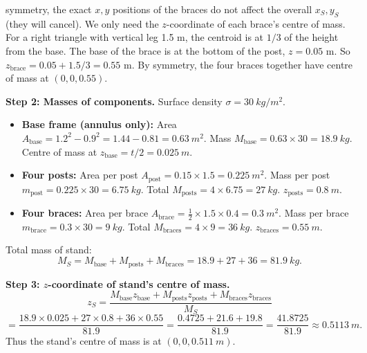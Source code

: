 \documentclass[11pt]{article}
\begin{document}
\begin{exoresolu}
\begin{enumerate}
symmetry, the exact $x,y$ positions of the braces do not affect the overall $x_S,y_S$ (they will cancel). We only need the $z$-coordinate of each brace's centre of mass. For a right triangle with vertical leg 1.5 m, the centroid is at $1/3$ of the height from the base. The base of the brace is at the bottom of the post, $z=0.05$ m. So $z_{\text{brace}} = 0.05 + 1.5/3 = 0.55$ m. By symmetry, the four braces together have centre of mass at $(0,0,0.55)$.
\end{enumerate}

\textbf{Step 2: Masses of components.}
Surface density $\sigma = \SI{30}{kg/m^2}$.
\begin{itemize}
    \item \textbf{Base frame (annulus only):} Area $A_{\text{base}} = 1.2^2 - 0.9^2 = 1.44 - 0.81 = \SI{0.63}{m^2}$. Mass $M_{\text{base}} = 0.63 \times 30 = \SI{18.9}{kg}$. Centre of mass at $z_{\text{base}} = t/2 = \SI{0.025}{m}$.
    \item \textbf{Four posts:} Area per post $A_{\text{post}} = 0.15 \times 1.5 = \SI{0.225}{m^2}$. Mass per post $m_{\text{post}} = 0.225 \times 30 = \SI{6.75}{kg}$. Total $M_{\text{posts}} = 4 \times 6.75 = \SI{27}{kg}$. $z_{\text{posts}} = \SI{0.8}{m}$.
    \item \textbf{Four braces:} Area per brace $A_{\text{brace}} = \frac{1}{2} \times 1.5 \times 0.4 = \SI{0.3}{m^2}$. Mass per brace $m_{\text{brace}} = 0.3 \times 30 = \SI{9}{kg}$. Total $M_{\text{braces}} = 4 \times 9 = \SI{36}{kg}$. $z_{\text{braces}} = \SI{0.55}{m}$.
\end{itemize}
Total mass of stand:
\[
M_S = M_{\text{base}} + M_{\text{posts}} + M_{\text{braces}} = 18.9 + 27 + 36 = \SI{81.9}{kg}.
\]

\textbf{Step 3: $z$-coordinate of stand's centre of mass.}
\[
z_S = \frac{M_{\text{base}} z_{\text{base}} + M_{\text{posts}} z_{\text{posts}} + M_{\text{braces}} z_{\text{braces}}}{M_S}
\]
\[
= \frac{18.9 \times 0.025 + 27 \times 0.8 + 36 \times 0.55}{81.9}
= \frac{0.4725 + 21.6 + 19.8}{81.9} = \frac{41.8725}{81.9} \approx \SI{0.5113}{m}.
\]
Thus the stand's centre of mass is at $(0, 0, \SI{0.511}{m})$.
\end{exoresolu}
\end{document}
